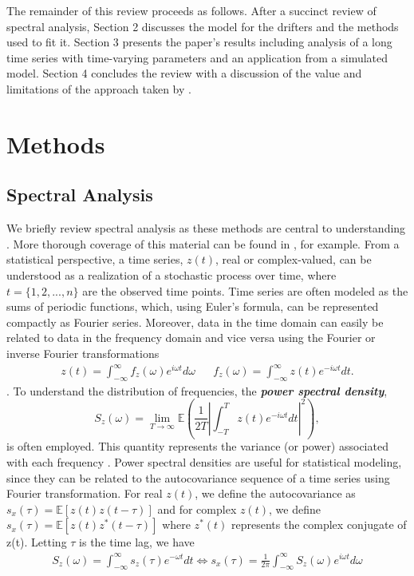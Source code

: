 \documentclass{stat572Style}
\begin{document}
\indent The remainder of this review proceeds as follows. After a succinct review of spectral analysis, Section 2 discusses the model for the drifters and the methods used to fit it. Section 3 presents the paper's results including analysis of a long time series with time-varying parameters and an application from a simulated model. Section 4 concludes the review with a discussion of the value and limitations of the approach taken by \citet{Sykulski2016}. 
\section{Methods}
			

	\subsection{Spectral Analysis}
	\label{sec: specAnalysis}
	\indent We briefly review spectral analysis as these methods are central to understanding \citet{Sykulski2016}.  More thorough coverage of this material can be found in  \citep{Percival1993}, for example. From a statistical perspective, a time series, $z(t)$, real or complex-valued,  can be understood as a realization of a stochastic process over time, where  $t = \{1,2,...,n\}$ are the observed time points.  Time series are often modeled as the sums of periodic functions, which, using Euler's formula, can be represented compactly as Fourier series. Moreover, data in the time domain can easily be related to data in the frequency domain and vice versa using the Fourier or inverse Fourier transformations 	\begin{align}
z(t) = \int_{-\infty}^{\infty} f_{z}(\omega)e^{i\omega t}d\omega && f_{z}(\omega) = \int_{-\infty}^{\infty} z(t) e^{-i \omega t }dt.
\end{align}
\citep{Percival1993}. To understand the distribution of frequencies, the \textbf{\it{power spectral density}},
\begin{equation}
S_{z}(\omega) = \underset{T \rightarrow \infty}{\lim} \mathbb{E} \left(\frac{1}{2T} \left| \int_{-T}^{T} z(t) e^{-i \omega t}dt \right|^{2} \right),
\end{equation}
is often employed. This quantity represents the variance (or power) associated with each frequency \citep{Percival1993}. Power spectral densities are useful for statistical modeling, since they can be related to the autocovariance sequence of a time series using  Fourier transformation.  For real $z(t)$, we define the autocovariance as $s_{x}(\tau) = \mathbb{E}[z(t) z(t - \tau)] $ and for complex $z(t)$, we define $s_{x}(\tau) = \mathbb{E}[z(t) z^{*}(t - \tau)] $ where $z^{*}(t)$ represents the complex conjugate of z(t). Letting $\tau$ is the time lag, we have
\begin{align}
\label{eq: fourierPair}
S_{z}(\omega) = \int_{-\infty}^{\infty}s_{z}(\tau) e^{-\omega t}dt  \Longleftrightarrow s_{x}(\tau) = \frac{1}{2\pi} \int_{-\infty}^{\infty}S_{z}(\omega) e^{i \omega t} d\omega 
\end{align}
\end{document}
